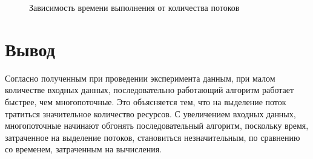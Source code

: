 \begin{figure}[H]
	\centering
	\captionsetup{justification=centering}
	\caption{Зависимость времени выполнения от количества потоков}
	\label{plt:times}
\end{figure}

\section*{Вывод}

Согласно полученным при проведении эксперимента данным, при малом количестве входных данных, последовательно работающий алгоритм работает быстрее, чем многопоточные. 
Это объясняется тем, что на выделение поток тратиться значительное количество ресурсов.
С увеличением входных данных, многопоточные начинают обгонять последовательный алгоритм, поскольку время, затраченное на выделение потоков, становиться незначительным, по сравнению со временем, затраченным на вычисления.